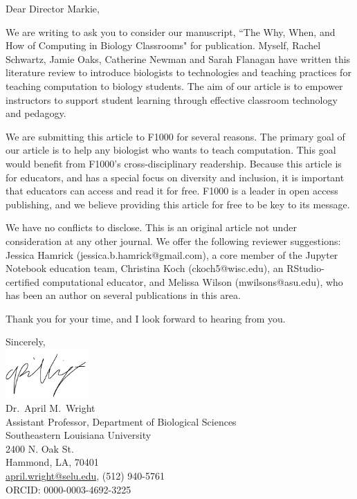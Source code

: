 \documentclass[12pt]{article}
\begin{document}
\thispagestyle{fancy}




Dear Director Markie,

We are writing to ask you to consider our manuscript, ``The Why, When, and How of Computing in Biology Classrooms" for publication. 
Myself, Rachel Schwartz, Jamie Oaks, Catherine Newman and Sarah Flanagan have written this literature review to introduce biologists to technologies and teaching practices for teaching computation to biology students.
The aim of our article is to empower instructors to support student learning through effective classroom technology and pedagogy.

We are submitting this article to F1000 for several reasons.
The primary goal of our article is to help any biologist who wants to teach computation.
This goal would benefit from F1000's cross-disciplinary readership.
Because this article is for educators, and has a special focus on diversity and inclusion, it is important that educators can access and read it for free.
F1000 is a leader in open access publishing, and we believe providing this article for free to be key to its message.

We have no conflicts to disclose. 
This is an original article not under consideration at any other journal.
We offer the following reviewer suggestions: Jessica Hamrick (jessica.b.hamrick@gmail.com), a core member of the Jupyter Notebook education team, Christina Koch (ckoch5@wisc.edu), an RStudio-certified computational educator, and Melissa Wilson (mwilsons@asu.edu), who has been an author on several publications in this area. 


Thank you for your time, and I look forward to hearing from you.

\vspace{5mm}
\noindent Sincerely,\\
\includegraphics[width=1.25in]{WrightSig2.jpg}\\
\noindent Dr.\ April M.\ Wright\\
Assistant Professor, Department of Biological Sciences\\
Southeastern Louisiana University\\
2400 N. Oak St.\\
Hammond, LA, 70401\\
\href{mailto:april.wright@selu.edu}{{april.wright@selu.edu}}, (512) 940-5761 \\
ORCID: 0000-0003-4692-3225
\end{document}
